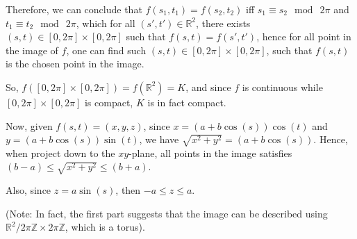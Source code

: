 \documentclass{article}
\begin{document}
Therefore, we can conclude that $f(s_1,t_1)=f(s_2,t_2)$ iff $s_1\equiv s_2\mod\ 2\pi$ and $t_1\equiv t_2\mod\ 2\pi$, which for all $(s',t')\in \mathbb{R}^2$,
there exists $(s,t)\in [0,2\pi]\times [0,2\pi]$ such that $f(s,t)=f(s',t')$, hence for all point in the image of $f$, one can find such $(s,t)\in [0,2\pi]\times [0,2\pi]$, such that $f(s,t)$ is the chosen point in the image.

So, $f([0,2\pi]\times [0,2\pi]) = f(\mathbb{R}^2)=K$, and since $f$ is continuous while $[0,2\pi]\times [0,2\pi]$ is compact, $K$ is in fact compact.

\hfil

Now, given $f(s,t)=(x,y,z)$, since $x=(a+b\cos(s))\cos(t)$ and $y=(a+b\cos(s))\sin(t)$, we have $\sqrt{x^2+y^2}=(a+b\cos(s))$.
Hence, when project down to the $xy$-plane, all points in the image satisfies $(b-a)\leq \sqrt{x^2+y^2}\leq (b+a)$.

Also, since $z=a\sin(s)$, then $-a\leq z\leq a$.

(Note: In fact, the first part suggests that the image can be described using $\mathbb{R}^2 / 2\pi\mathbb{Z}\times 2\pi\mathbb{Z}$, which is a torus).

\hfil
\end{document}
